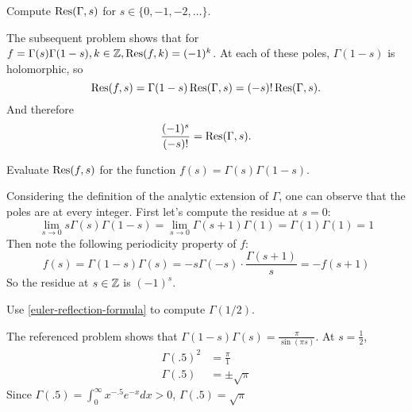 \documentclass{homework}
\begin{document}
                  \begin{problem}
                    Compute $\operatorname{Res}(\Gamma,s)$ for $s \in \{ 0, -1, -2, \ldots \}$.
                    \end{problem}
                    \begin{solution}
                    The subsequent problem shows that for $f= \Gamma(s)\Gamma(1-s), k\in \mathbb{Z}, \operatorname{Res}(f, k)= (-1)^k$. At each of these poles, $\Gamma(1-s)$ is holomorphic, so
                    \[
                    \operatorname{Res}(f, s) = \Gamma(1-s)\operatorname{Res}(\Gamma, s) = (-s)!\operatorname{Res}(\Gamma, s).
                    \]
                    And therefore
                    \[
                    \frac{(-1)^s}{(-s)!} = \operatorname{Res}(\Gamma, s).
                    \]
                    \end{solution}
                    \begin{problem}Evaluate $\operatorname{Res}(f,s)$ for the
                      function $f(s) = \Gamma(s) \Gamma(1-s)$.
                      \end{problem}
                      \begin{solution}
                      Considering the definition of the analytic extension of $\Gamma$, one can observe that the poles are at every integer.
                      First let's compute the residue at $s=0$:
                      \[
                      \lim_{s\to 0} s \Gamma(s) \Gamma(1-s) = \lim_{s\to 0} \Gamma(s+1)\Gamma(1) = \Gamma(1)\Gamma(1) = 1
                      \]
                      Then note the following periodicity property of $f$:
                      \[
                      f(s) = \Gamma(1-s)\Gamma(s) = -s\Gamma(-s) \cdot \frac{\Gamma(s+1)}{s} = -f(s+1)
                      \]
                      So the residue at $s \in \mathbb{Z}$ is $(-1)^s$.
                      \end{solution}
                      \begin{problem} %
                        Use \ref{euler-reflection-formula} to compute $\Gamma(1/2)$.  
                        \end{problem}
                        \begin{solution}
                        The referenced problem shows that $\Gamma(1-s)\Gamma(s) = \frac{\pi}{\sin(\pi s)}$. At $s=\frac{1}{2}$,
                        \begin{align*}
                        \Gamma(.5)^2&= \frac{\pi}{1}\\
                        \Gamma(.5)&= \pm \sqrt{\pi}
                        \end{align*}
                        Since $\Gamma(.5) =\int_0^\infty x^{-.5}e^{-x} dx > 0$, $\Gamma(.5) = \sqrt{\pi}$

                        \end{solution}
\end{document}
